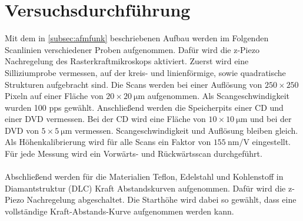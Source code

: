 \section{Versuchsdurchführung}
Mit dem in \autoref{subsec:afmfunk} beschriebenen Aufbau werden im Folgenden Scanlinien verschiedener Proben aufgenommen. Dafür wird die z-Piezo Nachregelung des Rasterkraftmikroskops aktiviert. Zuerst wird eine Silliziumprobe vermessen, auf der kreis- und linienförmige, sowie quadratische Strukturen aufgebracht sind. Die Scans werden bei einer Auflösung von $250 \times 250$ Pixeln auf einer Fläche von $20\times\SI{20}{\micro\meter}$ aufgenommen. Als Scangeschwindigkeit wurden 100 pps gewählt.
Anschließend werden die Speicherpits einer CD und einer DVD vermessen. Bei der CD wird eine Fläche von $10\times\SI{10}{\micro\meter}$ und bei der DVD von $5\times\SI{5}{\micro\meter}$ vermessen. Scangeschwindigkeit und Auflösung bleiben gleich. Als Höhenkalibrierung wird für alle Scans ein Faktor von $\SI{155}{\nano\meter\per\volt}$ eingestellt. Für jede Messung wird ein Vorwärts- und Rückwärtsscan durchgeführt.\\
\\
Abschließend werden für die Materialien Teflon, Edelstahl und Kohlenstoff in Diamantstruktur (DLC) Kraft Abstandskurven aufgenommen. Dafür wird die z-Piezo Nachregelung abgeschaltet. Die Starthöhe wird dabei so gewählt, dass eine vollständige Kraft-Abstands-Kurve aufgenommen werden kann. 
